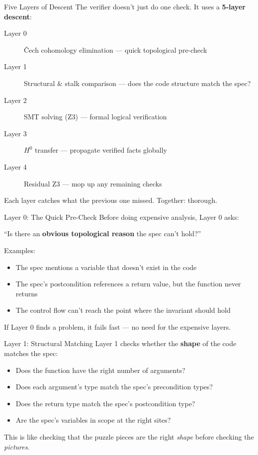 \documentclass[aspectratio=169,10pt]{beamer}
\newcommand{\hint}[1]{\begin{center}
  \colorbox{hintbg}{\parbox{0.88\textwidth}{\centering\small #1}}\end{center}}
\begin{document}
\begin{frame}{Five Layers of Descent}
The verifier doesn't just do one check. It uses a \textbf{5-layer descent}:
\vspace{0.3em}
\begin{description}
  \item[Layer 0] \v{C}ech cohomology elimination --- quick topological pre-check
  \item[Layer 1] Structural \& stalk comparison --- does the code structure match the spec?
  \item[Layer 2] SMT solving (Z3) --- formal logical verification
  \item[Layer 3] $H^0$ transfer --- propagate verified facts globally
  \item[Layer 4] Residual Z3 --- mop up any remaining checks
\end{description}
\vspace{0.3em}
\hint{Each layer catches what the previous one missed. Together: thorough.}
\end{frame}

\begin{frame}{Layer 0: The Quick Pre-Check}
Before doing expensive analysis, Layer 0 asks:
\begin{center}
``Is there an \textbf{obvious topological reason} the spec can't hold?''
\end{center}
\vspace{0.3em}
Examples:
\begin{itemize}
  \item The spec mentions a variable that doesn't exist in the code
  \item The spec's postcondition references a return value, but the function never returns
  \item The control flow can't reach the point where the invariant should hold
\end{itemize}
\vspace{0.3em}
If Layer 0 finds a problem, it fails fast --- no need for the expensive layers.
\end{frame}

\begin{frame}{Layer 1: Structural Matching}
Layer 1 checks whether the \textbf{shape} of the code matches the spec:
\vspace{0.3em}
\begin{itemize}
  \item Does the function have the right number of arguments?
  \item Does each argument's type match the spec's precondition types?
  \item Does the return type match the spec's postcondition type?
  \item Are the spec's variables in scope at the right sites?
\end{itemize}
\vspace{0.3em}
This is like checking that the puzzle pieces are the right \emph{shape} before checking the \emph{pictures}.
\end{frame}
\end{document}
